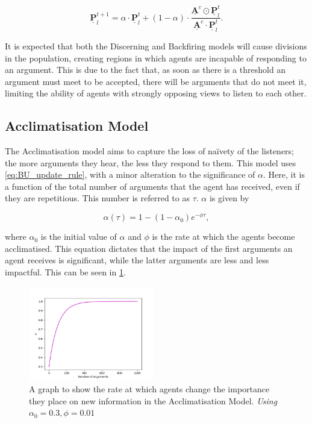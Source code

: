 \begin{equation} \label{eq:Backfiring_update_rule}
    \underline{\mathbf{P}}^{t+1}_l = \alpha \cdot \underline{\mathbf{P}}^{t}_l + (1 - \alpha) \cdot  \frac{\underline{\mathbf{A}}^c \odot \underline{\mathbf{P}}^t_l}{\underline{\mathbf{A}}^c \cdot \underline{\mathbf{P}}^t_l}.
\end{equation}

It is expected that both the Discerning and Backfiring models will cause divisions in the population, creating regions in which agents are incapable of responding to an argument. This is due to the fact that, as soon as there is a threshold an argument must meet to be accepted, there will be arguments that do not meet it, limiting the ability of agents with strongly opposing views to listen to each other. 



\subsection*{Acclimatisation Model}

The Acclimatisation model aims to capture the loss of na\"{i}vety of the listeners; the more arguments they hear, the less they respond to them. This model uses \cref{eq:BU_update_rule}, with a minor alteration to the significance of $\alpha$. Here, it is a function of the total number of arguments that the agent has received, even if they are repetitious. This number is referred to as $\tau$. $\alpha$ is given by

\begin{equation}
    \alpha (\tau) = 1 - (1 - \alpha_0) e^{-\phi \tau},
\end{equation}

where $\alpha_0$ is the initial value of $\alpha$ and $\phi$ is the rate at which the agents become acclimatised. This equation dictates that the impact of the first arguments an agent receives is significant, while the latter arguments are less and less impactful. This can be seen in \cref{fig:stubbornness_curve}. 

\begin{figure}[H]
    \centering
    \includegraphics[width=0.49\textwidth]{Images/Misc/Stubbornness.png}
    \caption{A graph to show the rate at which agents change the importance they place on new information in the Acclimatisation Model. \textit{Using $\alpha_0 = 0.3, \phi = 0.01$}}
    \label{fig:stubbornness_curve}
\end{figure}

